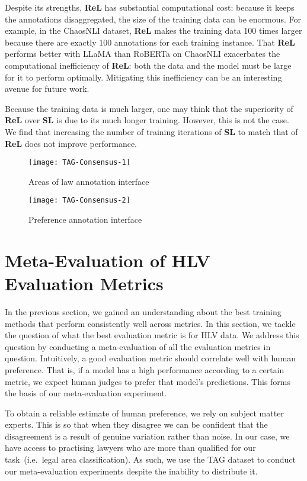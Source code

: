 \documentclass[shortpaper]{clv2025}
\newcommand{\methname}[1]{\textbf{#1}}  %
\begin{document}
Despite its strengths, \methname{ReL} has substantial computational cost:
because it keeps the annotations disaggregated, the size of the training data
can be enormous. For example, in the ChaosNLI dataset, \methname{ReL} makes
the training data 100 times larger because there are exactly 100 annotations for
each training instance. That \methname{ReL} performs better with LLaMA than
RoBERTa on ChaosNLI exacerbates the computational inefficiency of \methname{ReL}:
both the data and the model must be large for it to perform optimally.
Mitigating this inefficiency can be an interesting avenue for future work.

Because the training data is much larger, one may think that the superiority of
\methname{ReL} over \methname{SL} is due to its much longer training. However,
this is not the case. We find that increasing the number of training iterations
of \methname{SL} to match that of \methname{ReL} does not improve performance.

\begin{figure}
  \centering
  \texttt{[image: TAG-Consensus-1]}
  \caption{Areas of law annotation interface}\label{fig:aol-annot}
\end{figure}

\begin{figure}
  \centering
  \texttt{[image: TAG-Consensus-2]}
  \caption{Preference annotation interface}\label{fig:pref-annot}
\end{figure}

\section{Meta-Evaluation of HLV Evaluation Metrics}\label{sec:meta-eval}

In the previous section, we gained an understanding about the best training methods that perform consistently well
across metrics. In this section, we tackle the question of what the best evaluation metric is for HLV data. We address this question by conducting a meta-evaluation of all the evaluation metrics in question. Intuitively,
a good evaluation metric should correlate well with human preference. That is, if a model has a high performance according to a certain metric, we expect human judges to prefer that model's predictions. This forms the basis of our meta-evaluation experiment.

To obtain a reliable estimate of human preference, we rely on subject matter experts. This is so that when they disagree we can be confident that
the disagreement is a result of genuine variation rather than noise. In our case, we have access to practising lawyers who are more than qualified for our task~(i.e.\ legal area classification). As such, we use the TAG dataset to conduct our meta-evaluation experiments despite the inability to distribute
it.
\end{document}
